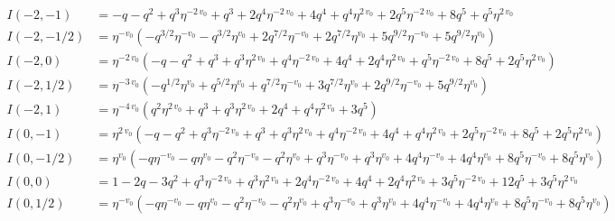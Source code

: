 \documentclass{article}
\begin{document}


\begin{align*}
I(-2, -1) &= -q - q^{2} + q^{3} \eta^{-2 \, v_{0}} + q^{3} + 2 q^{4} \eta^{-2 \, v_{0}} + 4 q^{4} + q^{4} \eta^{2 \, v_{0}} + 2 q^{5} \eta^{-2 \, v_{0}} + 8 q^{5} + q^{5} \eta^{2 \, v_{0}} \\
I(-2, -1/2) &= \eta^{-v_{0}} \left( -q^{3/2} \eta^{-v_{0}} - q^{3/2} \eta^{v_{0}} + 2 q^{7/2} \eta^{-v_{0}} + 2 q^{7/2} \eta^{v_{0}} + 5 q^{9/2} \eta^{-v_{0}} + 5 q^{9/2} \eta^{v_{0}} \right) \\
I(-2, 0) &= \eta^{-2 \, v_{0}} \left( -q - q^{2} + q^{3} + q^{3} \eta^{2 \, v_{0}} + q^{4} \eta^{-2 \, v_{0}} + 4 q^{4} + 2 q^{4} \eta^{2 \, v_{0}} + q^{5} \eta^{-2 \, v_{0}} + 8 q^{5} + 2 q^{5} \eta^{2 \, v_{0}} \right) \\
I(-2, 1/2) &= \eta^{-3 \, v_{0}} \left( -q^{1/2} \eta^{v_{0}} + q^{5/2} \eta^{v_{0}} + q^{7/2} \eta^{-v_{0}} + 3 q^{7/2} \eta^{v_{0}} + 2 q^{9/2} \eta^{-v_{0}} + 5 q^{9/2} \eta^{v_{0}} \right) \\
I(-2, 1) &= \eta^{-4 \, v_{0}} \left( q^{2} \eta^{2 \, v_{0}} + q^{3} + q^{3} \eta^{2 \, v_{0}} + 2 q^{4} + q^{4} \eta^{2 \, v_{0}} + 3 q^{5} \right) \\
I(0, -1) &= \eta^{2 \, v_{0}} \left( -q - q^{2} + q^{3} \eta^{-2 \, v_{0}} + q^{3} + q^{3} \eta^{2 \, v_{0}} + q^{4} \eta^{-2 \, v_{0}} + 4 q^{4} + q^{4} \eta^{2 \, v_{0}} + 2 q^{5} \eta^{-2 \, v_{0}} + 8 q^{5} + 2 q^{5} \eta^{2 \, v_{0}} \right) \\
I(0, -1/2) &= \eta^{v_{0}} \left( -q \eta^{-v_{0}} - q \eta^{v_{0}} - q^{2} \eta^{-v_{0}} - q^{2} \eta^{v_{0}} + q^{3} \eta^{-v_{0}} + q^{3} \eta^{v_{0}} + 4 q^{4} \eta^{-v_{0}} + 4 q^{4} \eta^{v_{0}} + 8 q^{5} \eta^{-v_{0}} + 8 q^{5} \eta^{v_{0}} \right) \\
I(0, 0) &= 1 - 2 q - 3 q^{2} + q^{3} \eta^{-2 \, v_{0}} + q^{3} \eta^{2 \, v_{0}} + 2 q^{4} \eta^{-2 \, v_{0}} + 4 q^{4} + 2 q^{4} \eta^{2 \, v_{0}} + 3 q^{5} \eta^{-2 \, v_{0}} + 12 q^{5} + 3 q^{5} \eta^{2 \, v_{0}} \\
I(0, 1/2) &= \eta^{-v_{0}} \left( -q \eta^{-v_{0}} - q \eta^{v_{0}} - q^{2} \eta^{-v_{0}} - q^{2} \eta^{v_{0}} + q^{3} \eta^{-v_{0}} + q^{3} \eta^{v_{0}} + 4 q^{4} \eta^{-v_{0}} + 4 q^{4} \eta^{v_{0}} + 8 q^{5} \eta^{-v_{0}} + 8 q^{5} \eta^{v_{0}} \right) \\

\end{align*}
\end{document}
